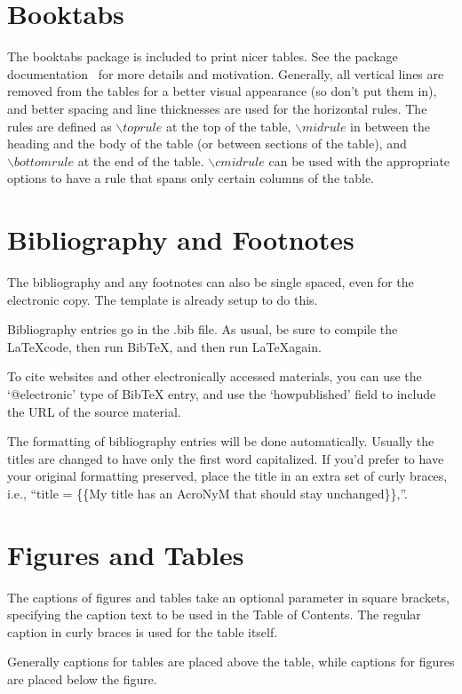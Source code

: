 \section{Booktabs}
The booktabs package is included to print nicer tables. See the package documentation~\cite{fear2005booktabs} for more details and motivation. Generally, all vertical lines are removed from the tables for a better visual appearance (so don't put them in), and better spacing and line thicknesses are used for the horizontal rules. The rules are defined as $\backslash toprule$ at the top of the table, $\backslash midrule$ in between the heading and the body of the table (or between sections of the table), and $\backslash bottomrule$ at the end of the table. $\backslash cmidrule$ can be used with the appropriate options to have a rule that spans only certain columns of the table.

\section{Bibliography and Footnotes}

The bibliography and any footnotes can also be single spaced, even for the electronic copy. The template is already setup to do this.

Bibliography entries go in the .bib file. As usual, be sure to compile the \LaTeX code, then run BibTeX, and then run \LaTeX again.

To cite websites and other electronically accessed materials, you can use the `@electronic' type of BibTeX entry, and use the `howpublished' field to include the URL of the source material.

The formatting of bibliography entries will be done automatically. Usually the titles are changed to have only the first word capitalized. If you'd prefer to have your original formatting preserved, place the title in an extra set of curly braces, i.e., ``title = \{\{My title has an AcroNyM that should stay unchanged\}\},''.

\section{Figures and Tables}
The captions of figures and tables take an optional parameter in square brackets, specifying the caption text to be used in the Table of Contents. The regular caption in curly braces is used for the table itself.

Generally captions for tables are placed above the table, while captions for figures are placed below the figure.

